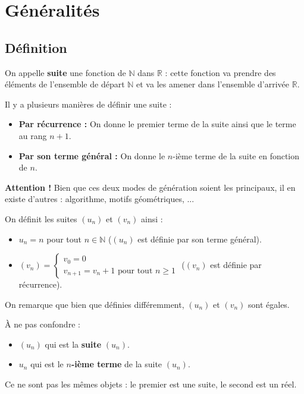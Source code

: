 



	\section{Généralités}

	\subsection{Définition}

	On appelle \textbf{suite} une fonction de $\mathbb{N}$ dans $\mathbb{R}$ : cette fonction va prendre des éléments de l'ensemble de départ $\mathbb{N}$ et va les amener dans l'ensemble d'arrivée $\mathbb{R}$.

	\begin{formula}[Définition]
		Il y a plusieurs manières de définir une suite :
		\begin{itemize}
			\item \textbf{Par récurrence :} On donne le premier terme de la suite ainsi que le terme au rang $n+1$.
			\item \textbf{Par son terme général :} On donne le $n$-ième terme de la suite en fonction de $n$.
		\end{itemize}
	\end{formula}

	\textbf{Attention !} Bien que ces deux modes de génération soient les principaux, il en existe d'autres : algorithme, motifs géométriques, ...

	\begin{tip}[Exemple]
		On définit les suites $(u_n)$ et $(v_n)$ ainsi :
		\begin{itemize}
			\item $u_n = n$ pour tout $n \in \mathbb{N}$ ($(u_n)$ est définie par son terme général).
			\item $(v_n) = \begin{cases} v_0 = 0 \\ v_{n+1} = v_n + 1 \text{ pour tout } n \geq 1 \end{cases}$ ($(v_n)$ est définie par récurrence).
		\end{itemize}
		On remarque que bien que définies différemment, $(u_n)$ et $(v_n)$ sont égales.
	\end{tip}

	\begin{tip}
		À ne pas confondre :
		\begin{itemize}
			\item $(u_n)$ qui est la \textbf{suite} $(u_n)$.
			\item $u_n$ qui est le \textbf{$n$-ième terme} de la suite $(u_n)$.
		\end{itemize}
		Ce ne sont pas les mêmes objets : le premier est une suite, le second est un réel.
	\end{tip}

